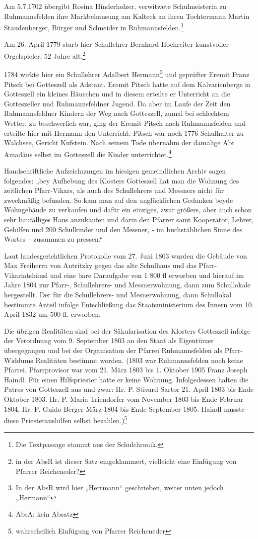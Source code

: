 \documentclass[12pt,a4paper]{book}
\begin{document}
Am 5.7.1702 übergibt Rosina Hinderholzer, verwitwete Schulmeisterin zu
Ruhmannsfelden ihre Markbehausung am Kalteck an ihren Tochtermann Martin
Staudenberger, Bürger und Schneider in Ruhmannsfelden.\footnote{Die
Textpassage stammt aus der Schulchronik.}

Am 26. April 1779 starb hier Schullehrer Bernhard Hochreiter kunstvoller
Orgelspieler, 52 Jahre alt.\footnote{in der AbsR ist dieser Satz
eingeklammert, vielleicht eine Einfügung von Pfarrer Reicheneder?}

1784 wirkte hier ein Schullehrer Adalbert Hermann\footnote{In der AbsR
wird hier „Herrmann“ geschrieben, weiter unten jedoch „Hermann“} und
geprüfter Eremit Franz Pitsch bei Gotteszell als Adstant. Eremit Pitsch
hatte auf dem Kalvarienberge in Gotteszell ein kleines Häuschen und in
diesem erteilte er Unterricht an die Gotteszeller und Ruhmannsfeldner
Jugend. Da aber im Laufe der Zeit den Ruhmannsfeldner Kindern der Weg
nach Gotteszell, zumal bei schlechtem Wetter, zu beschwerlich war, ging
der Eremit Pitsch nach Ruhmannsfelden und erteilte hier mit Hermann den
Unterricht. Pitsch war noch 1776 Schulhalter zu Walchsee, Gericht
Kufstein. Nach seinem Tode übernahm der damalige Abt Amadäus selbst im
Gotteszell die Kinder unterrichtet.\footnote{AbsA: kein Absatz}

Handschriftliche Aufzeichnungen im hiesigen gemeindlichen Archiv sagen
folgendes: „bey Aufhebung des Klosters Gotteszell hat man die Wohnung
des zeitlichen Pfarr-Vikars, als auch des Schullehrers und Messners
nicht für zweckmäßig befunden. So kam man auf den unglücklichen Gedanken
beyde Wohngebäude zu verkaufen und dafür ein einziges, zwar größers,
aber auch schon sehr baufälliges Haus anzukaufen und darin den Pfarrer
samt Kooperator, Lehrer, Gehilfen und 200 Schulkinder und den Messner, -
im buchstäblichen Sinne des Wortes – zusammen zu pressen.“

Laut landesgerichtlichen Protokolle vom 27. Juni 1803 wurden die Gebäude
von Max Freiherrn von Antritzky gegen das alte Schulhaus und das Pfarr-
Vikariatshäusl und eine bare Daraufgabe von 1 800 fl erworben und
hierauf im Jahre 1804 zur Pfarr-, Schullehrers- und Messnerwohnung, dann
zum Schullokale hergestellt. Der für die Schullehrers- und
Mesnerwohnung, dann Schullokal bestimmte Anteil infolge Entschließung
das Staatsministerium des Innern vom 10. April 1832 um 500 fl. erworben.

Die übrigen Realitäten sind bei der Säkularisation des Klosters
Gotteszell infolge der Verordnung vom 9. September 1803 an den Staat als
Eigentümer übergegangen und bei der Organisation der Pfarrei
Ruhmannsfelden als Pfarr-Widdums Realitäten bestimmt worden. (1803 war
Ruhmannsfelden noch keine Pfarrei. Pfarrprovisor war vom 21. März 1803
bis 1. Oktober 1905 Franz Joseph Haindl. Für einen Hilfspriester hatte
er keine Wohnung. Infolgedessen halten die Patres von Gotteszell aus und
zwar: Hr. P. Stivard Sartor 21. April 1803 bis Ende Oktober 1803. Hr. P.
Maria Triendorfer vom November 1803 bis Ende Februar 1804. Hr. P. Guido
Berger März 1804 bis Ende September 1805. Haindl musste diese
Priesteraushilfen selbst bezahlen.)\footnote{wahrscheilich Einfügung von
Pfarrer Reicheneder}
\end{document}
